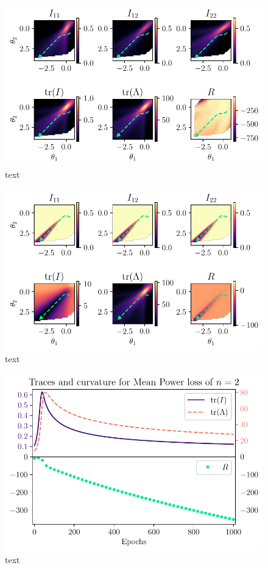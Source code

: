 \begin{figure}
	\centering
	\includegraphics{Experiment2/plots/LPNormLoss2_tracecomparison.pdf}
	\caption{text}
\end{figure}

\begin{figure}
	\centering
	\includegraphics{Experiment2/plots/CrossEntropyLoss_tracecomparison.pdf}
	\caption{text}
\end{figure}

\begin{figure}
	\centering
	\includegraphics{Experiment2/plots/MeanPowerLoss2_Curves.pdf}
	\caption{text}
\end{figure}


